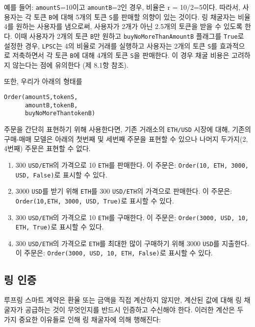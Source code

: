 \documentclass{article}
\begin{document}
\begin{multicols}{2}
예를 들어: \verb|amountS|=10이고 \verb|amountB|=2인 경우, 비율은  r = 10/2=5이다. 따라서, 사용자는 각 토큰 \verb|B|에 대해 5개의 토큰 \verb|S|를 판매할 의향이 있는 것이다. 링 채굴자는 비율 4를 원하는 사용자를 냄으로써, 사용자가 2개가 아닌 2.5개의 토큰을 받을 수 있도록 한다. 이때 사용자가 2개의 토큰 \verb|B|만 원하고 \verb|buyNoMoreThanAmountB| 플래그를 \verb|True|로 설정한 경우, \verb|LPSC|는 4의 비율로 거래를 실행하고 사용자는 2개의 토큰 \verb|S|를 효과적으로 저축하면서 각 토큰 \verb|B|에 대해 4개의 토큰 \verb|S|을 판매한다. 이 경우 채굴 비용은 고려하지 않는다는 점에 유의한다 (제 8.1항 참조).



또한, 우리가 아래의 형태를

\begin{verbatim}
Order(amountS,tokenS,
      amountB,tokenB,
      buyNoMoreThantokenB)
\end{verbatim}

주문을 간단히 표현하기 위해 사용한다면, 기존 거래소의 \verb|ETH/USD| 시장에 대해, 기존의 구매-매매 모델은 아래의 첫번째 및 세번째 주문을 표현할 수 있으나 나머지 두가지(2, 4번째) 주문은 표현할 수 없다.

\begin{enumerate}
	\item 300 \verb|USD/ETH|의 가격으로 10 \verb|ETH|를 판매한다. 이 주문은: \verb|Order(10, ETH, 3000, USD, False)|로 표시할 수 있다.
 
	\item 3000 \verb|USD|를 받기 위해 \verb|ETH|를 300 \verb|USD/ETH|의 가격으로 판매한다. 이 주문은: \verb|Order(10,ETH, 3000, USD, True)|로 표시할 수 있다.
	
	\item 300 \verb|USD/ETH|의 가격으로 10 \verb|ETH|를 구매한다. 이 주문은: \verb|Order(3000, USD, 10, ETH, True)|로 표시할 수 있다.
	
	\item 300 \verb|USD/ETH|의 가격으로 \verb|ETH|를 최대한 많이 구매하기 위해 3000 \verb|USD|를 지출한다. 이 주문은: \verb|Order(3000, USD, 10, ETH, False)|로 표시할 수 있다.
	
\end{enumerate}



\subsection{링 인증\label{sec:ring_verification}}

루프링 스마트 계약은 환율 또는 금액을 직접 계산하지 않지만, 계산된 값에 대해 링 채굴자가 공급하는 것이 무엇인지를 반드시 인증하고 수신해야 한다. 이러한 계산은 두 가지 중요한 이유들로 인해 링 채굴자에 의해 행해진다:


\end{multicols}
\end{document}
